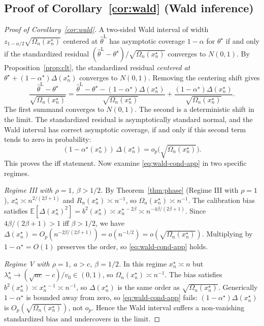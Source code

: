 \subsection{Proof of \texorpdfstring{Corollary~\ref{cor:wald}}{Corollary~\ref{cor:wald}} (Wald inference)}\label{proof:wald}

\begin{proof}[Proof of Corollary~\ref{cor:wald}]
A two-sided Wald interval of width $z_{1-\alpha/2}\sqrt{\Omega_n(x_n^\star)}$ centered at $\hat\theta^{\mathrm{L}}$ has asymptotic coverage $1-\alpha$ for $\theta^\star$ if and only if the standardized residual $(\hat\theta^{\mathrm{L}} - \theta^\star)/\sqrt{\Omega_n(x_n^\star)}$ converges to $N(0,1)$. By Proposition~\ref{prop:clt}, the standardized residual \emph{centered at $\theta^\star + (1-\alpha^\star)\Delta(x_n^\star)$} converges to $N(0,1)$. Removing the centering shift gives
\[
\frac{\hat\theta^{\mathrm{L}} - \theta^\star}{\sqrt{\Omega_n(x_n^\star)}}
= \frac{\hat\theta^{\mathrm{L}} - \theta^\star - (1-\alpha^\star)\Delta(x_n^\star)}{\sqrt{\Omega_n(x_n^\star)}}
+ \frac{(1-\alpha^\star)\Delta(x_n^\star)}{\sqrt{\Omega_n(x_n^\star)}}.
\]
The first summand converges to $N(0,1)$. The second is a deterministic shift in the limit. The standardized residual is asymptotically standard normal, and the Wald interval has correct asymptotic coverage, if and only if this second term tends to zero in probability:
\begin{equation}\label{eq:wald-cond-app}
(1 - \alpha^\star(x_n^\star))\, \Delta(x_n^\star) = o_p\bigl(\sqrt{\Omega_n(x_n^\star)}\bigr).
\end{equation}
This proves the iff statement. Now examine \cref{eq:wald-cond-app} in two specific regimes.

\emph{Regime III with $\rho = 1$, $\beta > 1/2$.} By Theorem~\ref{thm:phase} (Regime III with $\rho = 1$), $x_n^\star \asymp n^{2/(2\beta+1)}$ and $R_n(x_n^\star) \asymp n^{-1}$, so $\Omega_n(x_n^\star) \asymp n^{-1}$. The calibration bias satisfies $\mathbb{E}[\Delta(x_n^\star)^2] = b^2(x_n^\star) \asymp x_n^{\star\, -2\beta} \asymp n^{-4\beta/(2\beta+1)}$. Since $4\beta/(2\beta+1) > 1$ iff $\beta > 1/2$, we have $\Delta(x_n^\star) = O_p(n^{-2\beta/(2\beta+1)}) = o(n^{-1/2}) = o(\sqrt{\Omega_n(x_n^\star)})$. Multiplying by $1 - \alpha^\star = O(1)$ preserves the order, so \cref{eq:wald-cond-app} holds.

\emph{Regime V with $\rho = 1$, $a > c$, $\beta = 1/2$.} In this regime $x_n^\star \asymp n$ but $\lambda_n^\star \to (\sqrt{ac}-c)/v_0 \in (0,1)$, so $\Omega_n(x_n^\star) \asymp n^{-1}$. The bias satisfies $b^2(x_n^\star) \asymp x_n^{\star\, -1} \asymp n^{-1}$, so $\Delta(x_n^\star)$ is the same order as $\sqrt{\Omega_n(x_n^\star)}$. Generically $1 - \alpha^\star$ is bounded away from zero, so \cref{eq:wald-cond-app} fails: $(1-\alpha^\star)\Delta(x_n^\star)$ is $O_p(\sqrt{\Omega_n(x_n^\star)})$, not $o_p$. Hence the Wald interval suffers a non-vanishing standardized bias and undercovers in the limit.
\end{proof}

